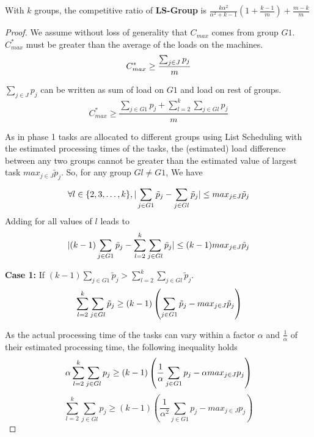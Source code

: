  \begin{theorem}
   \label{th:strategy3}
   With $k$ groups, the competitive ratio of
   \textbf{LS-Group } is $ \frac{k\alpha^{2}}{\alpha^{2}+k-1} (1+
   {\frac{k-1}{m}} ) + \frac{m-k}{m}$
 \end{theorem}
 \begin{proof} 
   We assume without loss of generality that $ C_{max}$ comes from
   group $G1$. $C_{max}^{*}$ must be greater than the average of the
   loads on the machines.
   \begin{equation}{\nonumber}
     C_{max}^{*} \geq  \frac{\sum_{j \in J}^{}{{p_{j}}}}{m}
   \end{equation}
 
   $\sum_{j \in J }{{p_{j}}}$ can be written as sum of load on $G1$ and
   load on rest of groups.
   \begin{equation}\label{eq11}
     C_{max}^{*} \geq  \frac{\sum_{j \in G1 }^{}{{p_{j}}}+ \sum_{l=2}^{k}\sum_{j \in Gl }^{}{{p_{j}}}}{m}
   \end{equation}
 
   As in phase 1 tasks are allocated to different groups using List
   Scheduling with the estimated processing times of the tasks, the
   (estimated) load difference between any two groups cannot be greater
   than the estimated value of largest task ${max_{j \in J}}{\tilde
     p_{j}}$.  So, for any group $Gl \neq G1$, We have
   \begin{equation}{\nonumber}
 \forall l \in \{2, 3, \dots ,k\}, |\sum_{j \in G1 }^{}{\tilde p_{j}}- \sum_{j \in Gl }^{}{\tilde p_{j}}| \leq {max_{j \in J}}{\tilde p_{j}}
   \end{equation}  
   Adding for all values of $l$ leads to
   \begin{equation}{\nonumber}
     |(k-1)\sum_{j \in G1 }^{}{\tilde p_{j}}- \sum_{l=2}^{k}\sum_{j \in Gl }^{}{\tilde p_{j}}| \leq (k-1) {max_{j \in J}}{\tilde p_{j}}
   \end{equation}
 
   \textbf{Case 1:} If $(k-1)\sum_{j \in G1 }^{}{\tilde p_{j}} >
   \sum_{l=2}^{k}\sum_{j \in Gl }^{}{\tilde p_{j}}$.
   \begin{equation}{\nonumber}
     \sum_{l=2}^{k}\sum_{j \in Gl }^{}{\tilde p_{j}} \geq (k-1) \left( \sum_{j \in G1 }^{}{\tilde p_{j}}- {max_{j \in J}}{\tilde p_{j}} \right)
   \end{equation}
 
   As the actual processing time of the tasks can vary within a factor
   $\alpha$ and $\frac{1}{\alpha}$ of their estimated processing time,
   the following inequality holds
   \begin{equation}{\nonumber}
     \alpha\sum_{l=2}^{k}\sum_{j \in Gl }^{}{{p_{j}}} \geq (k-1) \left( \frac{1}{\alpha}\sum_{j \in G1 }^{}{{p_{j}}}- \alpha {max_{j \in J}}{{p_{j}}} \right)
   \end{equation}
   \begin{equation}\label{eq9}
     \sum_{l=2}^{k}\sum_{j \in Gl }^{}{{p_{j}}} \geq (k-1) \left(\frac{1}{\alpha^{2}}\sum_{j \in G1 }^{}{{p_{j}}}-  {max_{j \in J}}{{p_{j}}} \right)
   \end{equation}
 

\end{proof}
